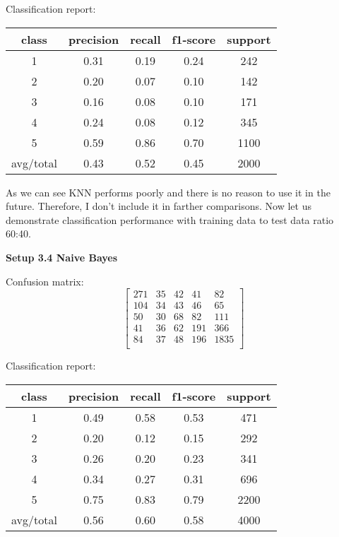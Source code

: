 \documentclass[12pt]{report}
\begin{document}
Classification report:

\begin{center}
	\begin{tabular}{c | c | c | c | c }
		\hline
		class & precision & recall & f1-score & support \\ \hline
		1 & 0.31 & 0.19 & 0.24 & 242 \\ \hline
		2 & 0.20 & 0.07 & 0.10 & 142 \\ \hline
		3 & 0.16 & 0.08 & 0.10 & 171 \\ \hline
		4 & 0.24 & 0.08 & 0.12 & 345 \\ \hline
		5 & 0.59 & 0.86 & 0.70 & 1100 \\ \hline
		avg/total & 0.43 & 0.52 & 0.45 & 2000 \\ \hline
	\end{tabular}
\end{center}

As we can see KNN performs poorly and there is no reason to use it in the future. Therefore, I don't include it in farther comparisons. Now let us demonstrate classification performance with training data to test data ratio 60:40.

\bigbreak

\textbf{Setup 3.4 Naive Bayes}

Confusion matrix:
\[
\begin{bmatrix}
271 & 35 &  42 & 41 & 82 \\
104 & 34 & 43 & 46 & 65 \\
50 & 30 & 68 & 82 & 111 \\
41 & 36 & 62 & 191 & 366 \\
84 & 37 & 48 & 196 & 1835 \\
\end{bmatrix}
\]

Classification report:

\begin{center}
	\begin{tabular}{c | c | c | c | c }
		\hline
		class & precision & recall & f1-score & support \\ \hline
		1 & 0.49 & 0.58 & 0.53 & 471 \\ \hline
		2 & 0.20 & 0.12 & 0.15 & 292 \\ \hline
		3 & 0.26 & 0.20 & 0.23 & 341 \\ \hline
		4 & 0.34 & 0.27 & 0.31 & 696 \\ \hline
		5 & 0.75 & 0.83 & 0.79 & 2200 \\ \hline
		avg/total & 0.56 & 0.60 & 0.58 & 4000 \\ \hline
	\end{tabular}
\end{center}
\end{document}
